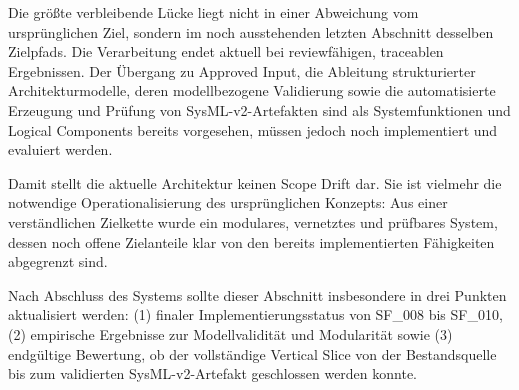 Die größte verbleibende Lücke liegt nicht in einer Abweichung vom ursprünglichen Ziel, sondern im noch ausstehenden letzten Abschnitt desselben Zielpfads. Die Verarbeitung endet aktuell bei reviewfähigen, traceablen Ergebnissen. Der Übergang zu Approved Input, die Ableitung strukturierter Architekturmodelle, deren modellbezogene Validierung sowie die automatisierte Erzeugung und Prüfung von SysML-v2-Artefakten sind als Systemfunktionen und Logical Components bereits vorgesehen, müssen jedoch noch implementiert und evaluiert werden.

Damit stellt die aktuelle Architektur keinen Scope Drift dar. Sie ist vielmehr die notwendige Operationalisierung des ursprünglichen Konzepts: Aus einer verständlichen Zielkette wurde ein modulares, vernetztes und prüfbares System, dessen noch offene Zielanteile klar von den bereits implementierten Fähigkeiten abgegrenzt sind.

\begin{tcolorbox}[
  enhanced,
  colback=gray!4,
  colframe=TuringSlate,
  title={Hinweis für die finale Fassung},
  fonttitle=\bfseries,
  arc=2mm
]
Nach Abschluss des Systems sollte dieser Abschnitt insbesondere in drei Punkten aktualisiert werden: (1) finaler Implementierungsstatus von SF\_008 bis SF\_010, (2) empirische Ergebnisse zur Modellvalidität und Modularität sowie (3) endgültige Bewertung, ob der vollständige Vertical Slice von der Bestandsquelle bis zum validierten SysML-v2-Artefakt geschlossen werden konnte.
\end{tcolorbox}
